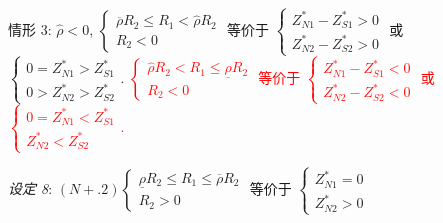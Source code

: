 \documentclass[10.0pt]{article}
\newcommand{\hhred}{\textcolor{red}}
\begin{document}
情形 3: $ {\hat \rho} < 0 $, $ \left\{ \begin{matrix} \overline{\rho} R_2 \leqslant R_1 < {\hat \rho} R_2 \\ R_2 < 0 \end{matrix} \right. $ 等价于 $ \left\{ \begin{matrix} Z_{N 1}^* - Z_{S 1}^* > 0 \\ Z_{N 2}^* - Z_{S 2}^* > 0 \end{matrix} \right. $ 或 $ \left\{ \begin{matrix} 0 = Z_{N 1}^* > Z_{S 1}^* \\ 0 > Z_{N 2}^* > Z_{S 2}^* \end{matrix} \right. $. \hhred{$ \left\{ \begin{matrix} {\hat \rho} R_2 < R_1 \leqslant \underline{\rho} R_2 \\ R_2 < 0 \end{matrix} \right. $ 等价于 $ \left\{ \begin{matrix} Z_{N 1}^* - Z_{S 1}^* < 0 \\ Z_{N 2}^* - Z_{S 2}^* < 0 \end{matrix} \right. $ 或 $ \left\{ \begin{matrix} 0 = Z_{N 1}^* < Z_{S 1}^* \\ Z_{N 2}^* < Z_{S 2}^* \end{matrix} \right. $.}

{\it 设定 8}: $ (N+.2) \left\{ \begin{matrix} \underline{\rho} R_2 \leqslant R_1 \leqslant \overline{\rho} R_2 \\ R_2 > 0 \end{matrix} \right. $ 等价于 $ \left\{ \begin{matrix} Z_{N 1}^* = 0 \\ Z_{N 2}^* > 0 \end{matrix} \right. $
\end{document}
